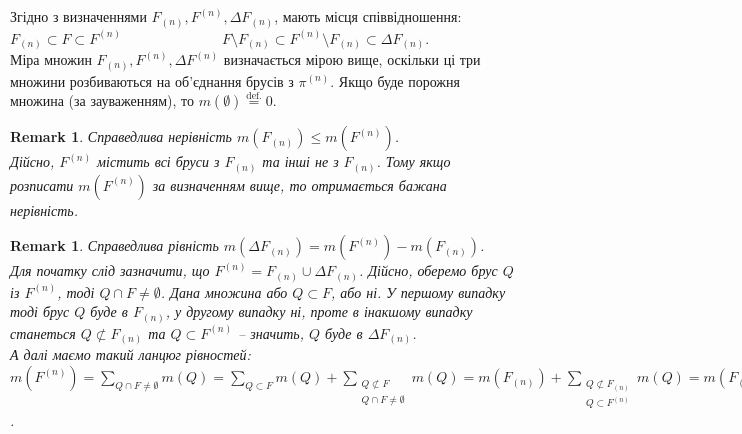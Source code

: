 \documentclass[a4paper, 10pt]{article}
\theoremstyle{theoremdd}
\theoremstyle{theoremdd}
\theoremstyle{theoremdd}
\theoremstyle{theoremdd}
\theoremstyle{theoremdd}
\theoremstyle{theoremdd}
\newtheorem{remark}[theorem]{Remark}
\theoremstyle{theoremdd}
\theoremstyle{theoremdd}
\begin{document}
Згідно з визначеннями $F_{(n)},F^{(n)}, \Delta F_{(n)}$, мають місця співвідношення:\\
$F_{(n)} \subset F \subset F^{(n)} \hspace{3cm} F \setminus F_{(n)} \subset F^{(n)} \setminus F_{(n)} \subset \Delta F_{(n)}$.\\
\iffalse
Перший ланцюг вкладень цілком зрозумілий. У другому ланцюгу перше вкладення зліва також зрозуміле. Залишилося останнє.\\
Якщо $x \in F^{(n)} \setminus F_{(n)}$, то $x$ потрапляє в брус $Q$, який має спільну точку з $F$, проте не лежить всередині $F$. Таким чином, $Q \subset F^{(n)}$ та $Q \not\subset F_{(n)}$, тож звідси $x \in \Delta F_{(n)}$. Зворотна сторона не працює за щойним зауваженням.\\
\fi
Міра множин $F_{(n)}, F^{(n)}, \Delta F^{(n)}$ визначається мірою вище, оскільки ці три множини розбиваються на об'єднання брусів з $\pi^{(n)}$. Якщо буде порожня множина (за зауваженням), то $m(\emptyset) \overset{\text{def.}}{=} 0$.

\begin{remark}
Справедлива нерівність $m(F_{(n)}) \leq m(F^{(n)})$.\\
Дійсно, $F^{(n)}$ містить всі бруси з $F_{(n)}$ та інші не з $F_{(n)}$. Тому якщо розписати $m(F^{(n)})$ за визначенням вище, то отримається бажана нерівність.
\end{remark}

\begin{remark}
Справедлива рівність $m(\Delta F_{(n)}) = m(F^{(n)}) - m(F_{(n)})$. \\
Для початку слід зазначити, що $F^{(n)} = F_{(n)} \cup \Delta F_{(n)}$. Дійсно, оберемо брус $Q$ із $F^{(n)}$, тоді $Q \cap F \neq \emptyset$. Дана множина або $Q \subset F$, або ні. У першому випадку тоді брус $Q$ буде в $F_{(n)}$, у другому випадку ні, проте в інакшому випадку станеться $Q \not\subset F_{(n)}$ та $Q \subset F^{(n)}$ -- значить, $Q$ буде в $\Delta F_{(n)}$.\\
А далі маємо такий ланцюг рівностей:\\
$m(F^{(n)}) = \displaystyle\sum_{Q \cap F \neq \emptyset} m(Q) = \sum_{Q \subset F} m(Q) + \sum_{\substack{Q \not\subset F \\ Q \cap F \neq \emptyset}} m(Q) = m(F_{(n)}) + \sum_{\substack{Q \not\subset F_{(n)} \\ Q \subset F^{(n)}}} m(Q) = m(F_{(n)}) + m(\Delta F_{(n)})$.
\end{remark}
\end{document}
